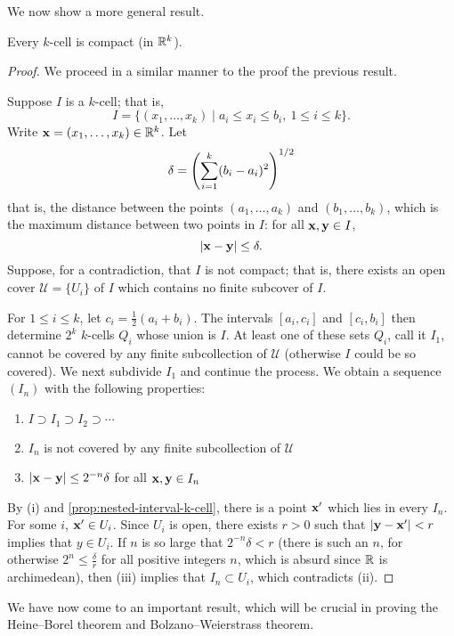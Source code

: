 We now show a more general result.

\begin{lemma}\label{lemma:k-cell-compact}
Every $k$-cell is compact (in $\mathbb R^k$).
\end{lemma}

\begin{proof}
We proceed in a similar manner to the proof the previous result.

Suppose $I$ is a $k$-cell; that is,
\[I=\{(x_1,\dots,x_k)\mid a_i\le x_i\le b_i,\:1\le i\le k\}.\]
Write $\vb{x}=(x_1,\dots,x_k)\in\mathbb R^k$. Let
\[\delta=\left(\sum_{i=1}^{k}(b_i-a_i)^2\right)^{1/2}\]
that is, the distance between the points $(a_1,\dots,a_k)$ and $(b_1,\dots,b_k)$, which is the maximum distance between two points in $I$: for all $\vb{x},\vb{y}\in I$,
\[|\vb{x}-\vb{y}|\le\delta.\]
Suppose, for a contradiction, that $I$ is not compact; that is, there exists an open cover $\mathcal{U}=\{U_i\}$ of $I$ which contains no finite subcover of $I$. 

For $1\le i\le k$, let $c_i=\frac{1}{2}(a_i+b_i)$. The intervals $[a_i,c_i]$ and $[c_i,b_i]$ then determine $2^k$ $k$-cells $Q_i$ whose union is $I$. At least one of these sets $Q_i$, call it $I_1$, cannot be covered by any finite subcollection of $\mathcal{U}$ (otherwise $I$ could be so covered). We next subdivide $I_1$ and continue the process. We obtain a sequence $(I_n)$ with the following properties:
\begin{enumerate}[label=(\roman*)]
\item $I\supset I_1\supset I_2\supset\cdots$
\item $I_n$ is not covered by any finite subcollection of $\mathcal{U}$
\item $|\vb{x}-\vb{y}|\le2^{-n}\delta$ for all $\vb{x},\vb{y}\in I_n$
\end{enumerate}
By (i) and \ref{prop:nested-interval-k-cell}, there is a point $\vb{x}^\prime$ which lies in every $I_n$. For some $i$, $\vb{x}^\prime\in U_i$. Since $U_i$ is open, there exists $r>0$ such that $|\vb{y}-\vb{x}^\prime|<r$ implies that $y\in U_i$. If $n$ is so large that $2^{-n}\delta<r$ (there is such an $n$, for otherwise $2^n\le\frac{\delta}{r}$ for all positive integers $n$, which is absurd since $\mathbb R$ is archimedean), then (iii) implies that $I_n\subset U_i$, which contradicts (ii).
\end{proof}

We have now come to an important result, which will be crucial in proving the Heine--Borel theorem and Bolzano--Weierstrass theorem.

